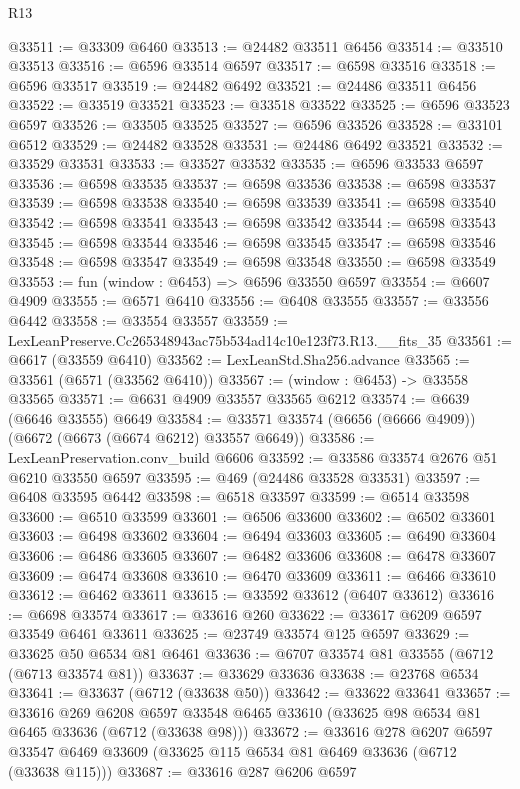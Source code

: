 \begin{lexlean}{R13}
\begin{coremodule}
@33511 := @33309 @6460
@33513 := @24482 @33511 @6456
@33514 := @33510 @33513
@33516 := @6596 @33514 @6597
@33517 := @6598 @33516
@33518 := @6596 @33517
@33519 := @24482 @6492
@33521 := @24486 @33511 @6456
@33522 := @33519 @33521
@33523 := @33518 @33522
@33525 := @6596 @33523 @6597
@33526 := @33505 @33525
@33527 := @6596 @33526
@33528 := @33101 @6512
@33529 := @24482 @33528
@33531 := @24486 @6492 @33521
@33532 := @33529 @33531
@33533 := @33527 @33532
@33535 := @6596 @33533 @6597
@33536 := @6598 @33535
@33537 := @6598 @33536
@33538 := @6598 @33537
@33539 := @6598 @33538
@33540 := @6598 @33539
@33541 := @6598 @33540
@33542 := @6598 @33541
@33543 := @6598 @33542
@33544 := @6598 @33543
@33545 := @6598 @33544
@33546 := @6598 @33545
@33547 := @6598 @33546
@33548 := @6598 @33547
@33549 := @6598 @33548
@33550 := @6598 @33549
@33553 := fun (window : @6453) => @6596 @33550 @6597
@33554 := @6607 @4909
@33555 := @6571 @6410
@33556 := @6408 @33555
@33557 := @33556 @6442
@33558 := @33554 @33557
@33559 := LexLeanPreserve.Cc265348943ac75b534ad14c10e123f73.R13.__fits_35
@33561 := @6617 (@33559 @6410)
@33562 := LexLeanStd.Sha256.advance
@33565 := @33561 (@6571 (@33562 @6410))
@33567 := (window : @6453) -> @33558 @33565
@33571 := @6631 @4909 @33557 @33565 @6212
@33574 := @6639 (@6646 @33555) @6649
@33584 := @33571 @33574 (@6656 (@6666 @4909)) (@6672 (@6673 (@6674 @6212) @33557 @6649))
@33586 := LexLeanPreservation.conv_build @6606
@33592 := @33586 @33574 @2676 @51 @6210 @33550 @6597
@33595 := @469 (@24486 @33528 @33531)
@33597 := @6408 @33595 @6442
@33598 := @6518 @33597
@33599 := @6514 @33598
@33600 := @6510 @33599
@33601 := @6506 @33600
@33602 := @6502 @33601
@33603 := @6498 @33602
@33604 := @6494 @33603
@33605 := @6490 @33604
@33606 := @6486 @33605
@33607 := @6482 @33606
@33608 := @6478 @33607
@33609 := @6474 @33608
@33610 := @6470 @33609
@33611 := @6466 @33610
@33612 := @6462 @33611
@33615 := @33592 @33612 (@6407 @33612)
@33616 := @6698 @33574
@33617 := @33616 @260
@33622 := @33617 @6209 @6597 @33549 @6461 @33611
@33625 := @23749 @33574 @125 @6597
@33629 := @33625 @50 @6534 @81 @6461
@33636 := @6707 @33574 @81 @33555 (@6712 (@6713 @33574 @81))
@33637 := @33629 @33636
@33638 := @23768 @6534
@33641 := @33637 (@6712 (@33638 @50))
@33642 := @33622 @33641
@33657 := @33616
    @269
    @6208
    @6597
    @33548
    @6465
    @33610
    (@33625 @98 @6534 @81 @6465 @33636 (@6712 (@33638 @98)))
@33672 := @33616
    @278
    @6207
    @6597
    @33547
    @6469
    @33609
    (@33625 @115 @6534 @81 @6469 @33636 (@6712 (@33638 @115)))
@33687 := @33616
    @287
    @6206
    @6597

\end{coremodule}
\end{lexlean}

